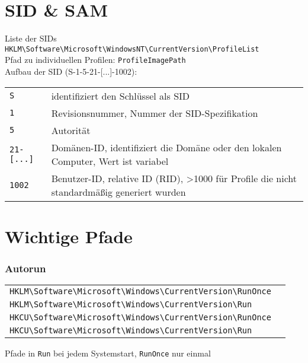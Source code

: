 \begin{multicols}{3}
\section{SID \& SAM}
Liste der SIDs \texttt{HKLM\textbackslash Software\textbackslash Microsoft\textbackslash WindowsNT\textbackslash CurrentVersion\textbackslash ProfileList}\\
Pfad zu individuellen Profilen: \texttt{ProfileImagePath}\\
Aufbau der SID (S-1-5-21-[...]-1002):
\begin{tabular}{@{}p{\the\MyLen}%
		@{}p{\linewidth-\the\MyLen}@{}}
	\texttt{S} & identifiziert den Schlüssel als SID\\
	\texttt{1} & Revisionsnummer, Nummer der SID-Spezifikation\\
	\texttt{5} & Autorität\\
	\texttt{21-[...]} & Domänen-ID, identifiziert die Domäne oder den lokalen Computer, Wert ist variabel\\
	\texttt{1002} & Benutzer-ID, relative ID (RID), >1000 für Profile die nicht standardmäßig generiert wurden
\end{tabular}

\section{Wichtige Pfade}
\subsubsection{Autorun}
\begin{tabular}{@{}p{\the\MyLen}%
		@{}p{\linewidth-\the\MyLen}@{}}
	\texttt{HKLM\textbackslash Software\textbackslash Microsoft\textbackslash Windows\textbackslash CurrentVersion\textbackslash RunOnce} & \\
	\texttt{HKLM\textbackslash Software\textbackslash Microsoft\textbackslash Windows\textbackslash CurrentVersion\textbackslash Run} & \\
	\texttt{HKCU\textbackslash Software\textbackslash Microsoft\textbackslash Windows\textbackslash CurrentVersion\textbackslash RunOnce} & \\
	\texttt{HKCU\textbackslash Software\textbackslash Microsoft\textbackslash Windows\textbackslash CurrentVersion\textbackslash Run} & \\
\end{tabular}
Pfade in \texttt{Run} bei jedem Systemstart, \texttt{RunOnce} nur einmal


\end{multicols}

